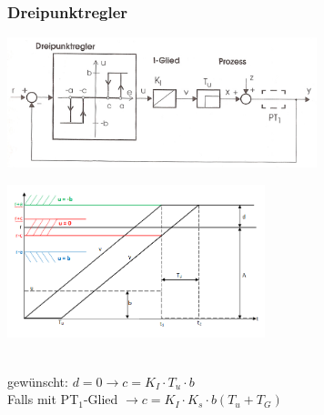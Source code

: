 	\subsubsection{Dreipunktregler}
		\begin{minipage}{9cm}
		\includegraphics[width=9cm]{./bilder/Dreipunktregler.jpg}
        \end{minipage}
		\begin{minipage}{7.5cm}
        \includegraphics[width=7.5cm]{./bilder/Dreipunktregler_dia.png}
        \end{minipage}\\
		gewünscht: $d = 0 \rightarrow c = K_I \cdot T_u \cdot b$\\
		Falls mit PT$_1$-Glied $\rightarrow c = K_I \cdot K_s \cdot b (T_u + T_G)$
